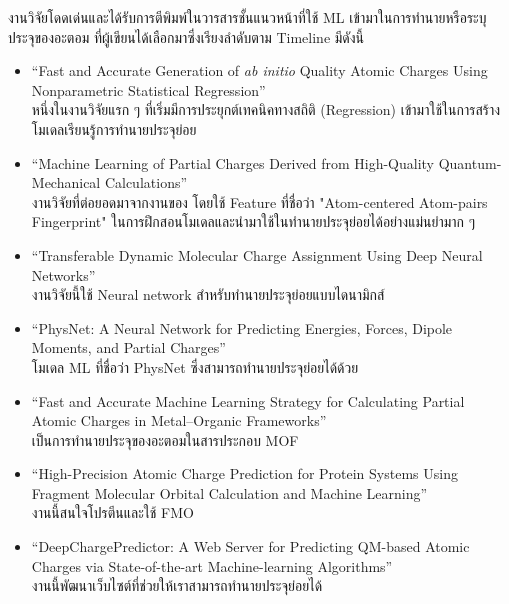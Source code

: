 งานวิจัยโดดเด่นและได้รับการตีพิมพ์ในวารสารชั้นแนวหน้าที่ใช้ ML เข้ามาในการทำนายหรือระบุประจุของอะตอม ที่ผู้เขียนได้เลือกมาซึ่งเรียงลำดับตาม 
Timeline มีดังนี้

\begin{itemize}
    \item \enquote{Fast and Accurate Generation of \textit{ab initio} Quality Atomic Charges Using Nonparametric 
    Statistical Regression}\autocite{rai2013} \\ 
    หนึ่งในงานวิจัยแรก ๆ ที่เริ่มมีการประยุกต์เทคนิคทางสถิติ (Regression) เข้ามาใช้ในการสร้างโมเดลเรียนรู้การทำนายประจุย่อย
    
    \item \enquote{Machine Learning of Partial Charges Derived from High-Quality Quantum-Mechanical Calculations} 
    \autocite{bleiziffer2018} \\
    งานวิจัยที่ต่อยอดมาจากงานของ โดยใช้ Feature ที่ชื่อว่า "Atom-centered Atom-pairs Fingerprint"\autocite{carhart1985} 
    ในการฝึกสอนโมเดลและนำมาใช้ในทำนายประจุย่อยได้อย่างแม่นยำมาก ๆ
    
    \item \enquote{Transferable Dynamic Molecular Charge Assignment Using Deep Neural Networks}\autocite{nebgen2018} \\
    งานวิจัยนี้ใช้ Neural network สำหรับทำนายประจุย่อยแบบไดนามิกส์
    
    \item \enquote{PhysNet: A Neural Network for Predicting Energies, Forces, Dipole Moments, and Partial Charges}
    \autocite{unke2019} \\
    โมเดล ML ที่ชื่อว่า PhysNet ซึ่งสามารถทำนายประจุย่อยได้ด้วย
    
    \item \enquote{Fast and Accurate Machine Learning Strategy for Calculating Partial Atomic Charges in Metal–Organic
    Frameworks}\autocite{kancharlapalli2021} \\ 
    เป็นการทำนายประจุของอะตอมในสารประกอบ MOF
    
    \item \enquote{High-Precision Atomic Charge Prediction for Protein Systems Using Fragment Molecular Orbital 
    Calculation and Machine Learning}\autocite{kato2020} \\ 
    งานนี้สนใจโปรตีนและใช้ FMO
    
    \item \enquote{DeepChargePredictor: A Web Server for Predicting QM-based Atomic Charges via State-of-the-art 
    Machine-learning Algorithms}\autocite{wang2021} \\ 
    งานนี้พัฒนาเว็บไซต์ที่ช่วยให้เราสามารถทำนายประจุย่อยได้
\end{itemize}

